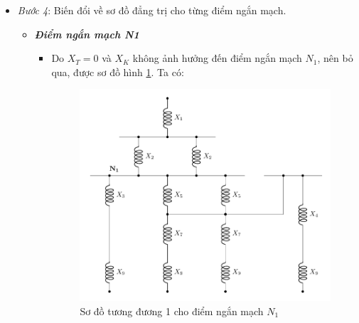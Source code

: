 \documentclass[12pt,a4paper]{article}
\begin{document}
\begin{itemize}
	\item \textit{Bước 4}: Biến đổi về sơ đồ đẳng trị cho từng điểm ngắn mạch.
		\begin{itemize}
			\item \textbf{\textit{Điểm ngắn mạch N1}}
				\begin{itemize}
					\item Do $X_T = 0 $ và $X_K$ không ảnh hưởng đến điểm ngắn mạch $N_1$, nên bỏ qua, được sơ đồ hình \ref{Fig:sodo-tuongduong-bt1-N1-1}. Ta có:
					\begin{figure}[!h]
						\begin{center}
							\includegraphics[scale=1]{figure-baitap-nganmach-1-N1-1.pdf} 
						\end{center}
						\caption{Sơ đồ tương đương 1 cho điểm ngắn mạch $N_1$} \label{Fig:sodo-tuongduong-bt1-N1-1}
						
					\end{figure}

\end{itemize}
\end{itemize}
\end{itemize}
\end{document}
